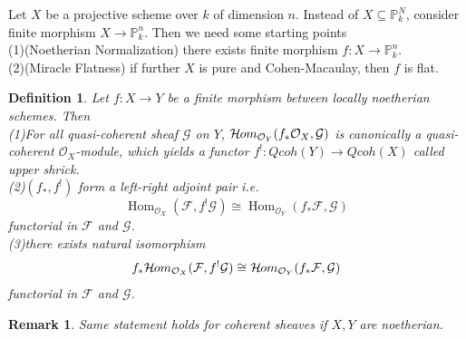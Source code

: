 \documentclass{ctexart}
\newtheorem{definition}{Definition}[section]
\newtheorem{remark}{Remark}[section]
\renewcommand{\hom}{\operatorname{Hom}}
\newcommand{\sheafhom}{\mathcal{H}\kern -.5pt om}
\begin{document}
Let $X$ be a projective scheme over $k$ of dimension $n$.
Instead of $X \subseteq \mathbb{P}_{k}^{N}$, consider finite morphism $X \longrightarrow \mathbb{P}_{k}^{n}$.
Then we need some starting points \\
(1)(Noetherian Normalization) there exists finite morphism $f: X \longrightarrow \mathbb{P}_{k}^{n}$. \\
(2)(Miracle Flatness) if further $X$ is pure and Cohen-Macaulay, then $f$ is flat.
\begin{definition}
    Let $f: X \longrightarrow Y$ be a finite morphism between locally noetherian schemes.
    Then \\
    (1)For all quasi-coherent sheaf $\mathcal{G}$ on $Y$, $\sheafhom_{\mathcal{O}_{Y}}(f_{\ast}\mathcal{O}_{X}, \mathcal{G})$ is canonically a quasi-coherent $\mathcal{O}_{X}$-module,
    which yields a functor $f^{!}: Qcoh(Y) \longrightarrow Qcoh(X)$ called upper shrick. \\
    (2)$(f_{\ast}, f^{!})$ form a left-right adjoint pair i.e.
    \begin{equation*}
        \hom_{\mathcal{O}_{X}}(\mathcal{F}, f^{!}\mathcal{G}) \cong \hom_{\mathcal{O}_{Y}}(f_{\ast}\mathcal{F}, \mathcal{G})
    \end{equation*}
    functorial in $\mathcal{F}$ and $\mathcal{G}$. \\
    (3)there exists natural isomorphism 
    \begin{equation*}
        f_{\ast}\sheafhom_{\mathcal{O}_{X}}(\mathcal{F}, f^{!}\mathcal{G}) \cong \sheafhom_{\mathcal{O}_{Y}}(f_{\ast}\mathcal{F}, \mathcal{G})
    \end{equation*}
    functorial in $\mathcal{F}$ and $\mathcal{G}$.
\end{definition}
\begin{remark}
    Same statement holds for coherent sheaves if $X, Y$ are noetherian.
\end{remark}
\end{document}
